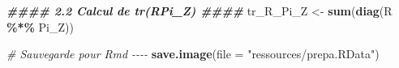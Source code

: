 \documentclass[
]{article}
\newenvironment{Shaded}{\begin{snugshade}}{\end{snugshade}}
\newcommand{\AttributeTok}[1]{\textcolor[rgb]{0.13,0.29,0.53}{#1}}
\newcommand{\CommentTok}[1]{\textcolor[rgb]{0.56,0.35,0.01}{\textit{#1}}}
\newcommand{\DocumentationTok}[1]{\textcolor[rgb]{0.56,0.35,0.01}{\textbf{\textit{#1}}}}
\newcommand{\FunctionTok}[1]{\textcolor[rgb]{0.13,0.29,0.53}{\textbf{#1}}}
\newcommand{\NormalTok}[1]{#1}
\newcommand{\OtherTok}[1]{\textcolor[rgb]{0.56,0.35,0.01}{#1}}
\newcommand{\SpecialCharTok}[1]{\textcolor[rgb]{0.81,0.36,0.00}{\textbf{#1}}}
\newcommand{\StringTok}[1]{\textcolor[rgb]{0.31,0.60,0.02}{#1}}
\begin{document}
\begin{Shaded}
\begin{Highlighting}[]
\DocumentationTok{\#\#\#\# 2.2 Calcul de tr(RPi\_Z) \#\#\#\#}
\NormalTok{tr\_R\_Pi\_Z }\OtherTok{\textless{}{-}} \FunctionTok{sum}\NormalTok{(}\FunctionTok{diag}\NormalTok{(R }\SpecialCharTok{\%*\%}\NormalTok{ Pi\_Z))}

\CommentTok{\# Sauvegarde pour Rmd {-}{-}{-}{-}}
\FunctionTok{save.image}\NormalTok{(}\AttributeTok{file =} \StringTok{"ressources/prepa.RData"}\NormalTok{)}
\end{Highlighting}
\end{Shaded}
\end{document}
